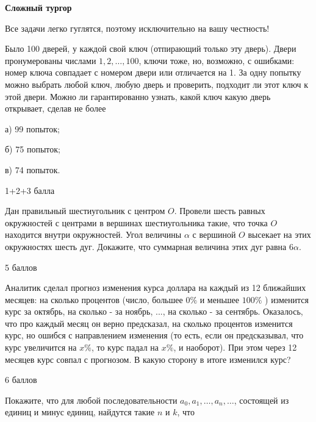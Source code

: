 \centerline{\bf \Huge Сложный тургор}

\begin{flushright}
        \scriptsize{Все задачи легко гуглятся, поэтому исключительно на вашу честность!}
\end{flushright}

Было 100 дверей, у каждой свой ключ (отпирающий только эту дверь). Двери пронумерованы числами $1,2, \ldots, 100$, ключи тоже, но, возможно, с ошибками: номер ключа совпадает с номером двери или отличается на 1. За одну попытку можно выбрать любой ключ, любую дверь и проверить, подходит ли этот ключ к этой двери. Можно ли гарантированно узнать, какой ключ какую дверь открывает, сделав не более

а) 99 попыток;

б) 75 попыток;

в) 74 попыток.

\begin{flushright}
        \scriptsize{1+2+3 балла}
\end{flushright}

Дан правильный шестиугольник с центром $O$. Провели шесть равных окружностей с центрами в вершинах шестиугольника такие, что точка $O$ находится внутри окружностей. Угол величины $\alpha$ с вершиной $O$ высекает на этих окружностях шесть дуг. Докажите, что суммарная величина этих дуг равна $6 \alpha$.

\begin{flushright}
        \scriptsize{5 баллов}
\end{flushright}

Аналитик сделал прогноз изменения курса доллара на каждый из 12 ближайших месяцев: на сколько процентов (число, большее $0 \%$ и меньшее $100 \%$ ) изменится курс за октябрь, на сколько - за ноябрь, ..., на сколько - за сентябрь. Оказалось, что про каждый месяц он верно предсказал, на сколько процентов изменится курс, но ошибся с направлением изменения (то есть, если он предсказывал, что курс увеличится на $x \%$, то курс падал на $x \%$, и наоборот). При этом через 12 месяцев курс совпал с прогнозом. В какую сторону в итоге изменился курс?

\begin{flushright}
        \scriptsize{6 баллов}
\end{flushright}


Покажите, что для любой последовательности $a_0, a_1, \ldots, a_n, \ldots$, состоящей из единиц и минус единиц, найдутся такие $n$ и $k$, что

